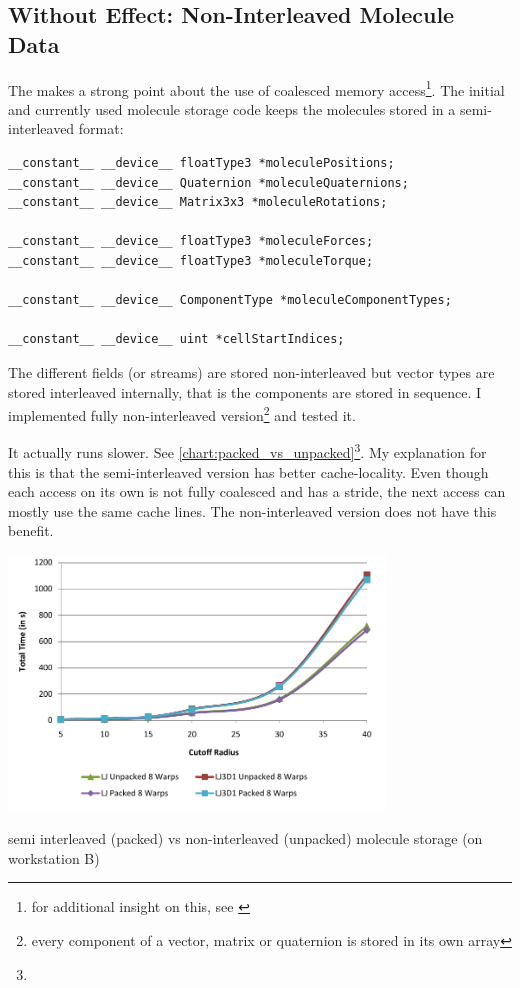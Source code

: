 \subsection{Without Effect: Non-Interleaved Molecule Data}
The \cite{cuda11bestpract} makes a strong point about the use of coalesced memory access\footnote{for additional insight on this, see \cite{volkov10}}. The initial and currently used molecule storage code keeps the molecules stored in a semi-interleaved format:
\begin{lstlisting}[caption=Molecule Storage Declarations]
__constant__ __device__ floatType3 *moleculePositions;
__constant__ __device__ Quaternion *moleculeQuaternions;
__constant__ __device__ Matrix3x3 *moleculeRotations;

__constant__ __device__ floatType3 *moleculeForces;
__constant__ __device__ floatType3 *moleculeTorque;

__constant__ __device__ ComponentType *moleculeComponentTypes;

__constant__ __device__ uint *cellStartIndices;
\end{lstlisting}
The different fields (or streams) are stored non-interleaved but vector types are stored interleaved internally, that is the components are stored in sequence. I implemented fully non-interleaved version\footnote{every component of a vector, matrix or quaternion is stored in its own array} and tested it.

It actually runs slower. See \autoref{chart:packed_vs_unpacked}\footnote{\cudaConfigDouble{}}. My explanation for this is that the semi-interleaved version has better cache-locality. Even though each access on its own is not fully coalesced and has a stride, the next access can mostly use the same cache lines.
The non-interleaved version does not have this benefit.
\begin{chart}
\centering
\includegraphics[width=0.75\textwidth]{plots/packed_vs_unpacked.pdf}
\caption{semi interleaved (packed) vs non-interleaved (unpacked) molecule storage (on workstation B)}
\label{chart:packed_vs_unpacked}
\end{chart}
